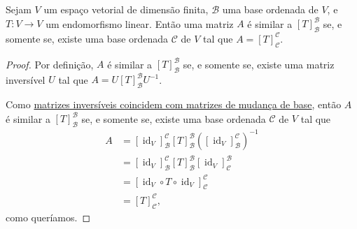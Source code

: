 \begin{theorem}
	Sejam $V$ um espaço vetorial de dimensão finita, $\mathcal{B}$ uma base ordenada de $V$, e $T\colon V\to V$ um endomorfismo linear. Então uma matriz $A$ é similar a $\left[ T\right]_{\mathcal{B}}^{\mathcal{B}}$ se, e somente se, existe uma base ordenada $\mathcal{C}$ de $V$ tal que $A=\left[T\right]_{\mathcal{C}}^{\mathcal{C}}$.
\end{theorem}

\begin{proof}
	Por definição, $A$ é similar a $\left[T\right]_{\mathcal{B}}^{\mathcal{B}}$ se, e somente se, existe uma matriz inversível $U$ tal que
	$A=U\left[T\right]_{\mathcal{B}}^{\mathcal{B}}U^{-1}$.
	
	Como \href{http://mtm.ufsc.br/~cordeiro/ensino/mtm3112.algebra.linear/16.mudanca.de.base/teo_mat_inv_mud_base_moodle.html}{matrizes inversíveis coincidem com matrizes de mudança de base}, então $A$ é similar a $\left[T\right]_{\mathcal{B}}^{\mathcal{B}}$ se, e somente se, existe uma base ordenada $\mathcal{C}$ de $V$ tal que
	\begin{align*}
	A
		&=[\operatorname{id}_V]_{\mathcal{B}}^{\mathcal{C}}\left[T\right]_{\mathcal{B}}^{\mathcal{B}}\left([\operatorname{id}_V]_{\mathcal{B}}^{\mathcal{C}}\right)^{-1}\\
		&=[\operatorname{id}_V]_{\mathcal{B}}^{\mathcal{C}}\left[T\right]_{\mathcal{B}}^{\mathcal{B}}[\operatorname{id}_V]_{\mathcal{C}}^{\mathcal{B}}\\
		&=\left[\operatorname{id}_V\circ T\circ\operatorname{id}_V\right]_{\mathcal{C}}^{\mathcal{C}}\\
		&=\left[T\right]_{\mathcal{C}}^{\mathcal{C}},
	\end{align*}
	como queríamos.
\end{proof}